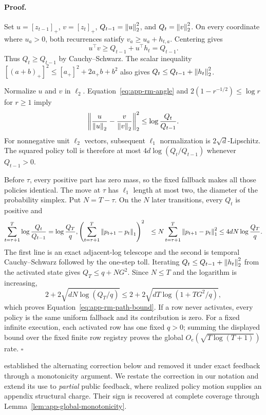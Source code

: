 \paragraph{Proof.}
Set $u=[z_{t-1}]_+$, $v=[z_t]_+$,
$Q_{t-1}=\left\lVert u \right\rVert_2^2$, and $Q_t=\left\lVert v \right\rVert_2^2$.  On every coordinate where
$u_a>0$, both recurrences satisfy $v_a\ge u_a+h_{t,a}$.  Centering gives
\begin{equation}
u^\top v\ge Q_{t-1}+u^\top h_t=Q_{t-1}.
\label{eq:app-rm-angle}
\end{equation}
Thus $Q_t\ge Q_{t-1}$ by Cauchy--Schwarz.  The scalar inequality
$[(a+b)_+]^2\le[a_+]^2+2a_+b+b^2$ also gives
$Q_t\le Q_{t-1}+\left\lVert h_t \right\rVert_2^2$.

Normalize $u$ and $v$ in $\ell_2$.  Equation~\ref{eq:app-rm-angle} and
$2(1-r^{-1/2})\le\log r$ for $r\ge1$ imply
\begin{equation}
\left\lVert \frac{u}{\left\lVert u \right\rVert_2}-\frac{v}{\left\lVert v \right\rVert_2} \right\rVert_2^2
\le\log\frac{Q_t}{Q_{t-1}}.
\end{equation}
For nonnegative unit $\ell_2$ vectors, subsequent $\ell_1$ normalization is
$2\sqrt d$-Lipschitz.  The squared policy toll is therefore at most
$4d\log(Q_t/Q_{t-1})$ whenever $Q_{t-1}>0$.

Before $\tau$, every positive part has zero mass, so the fixed fallback makes
all those policies identical.  The move at $\tau$ has $\ell_1$ length at
most two, the diameter of the probability simplex.  Put $N=T-\tau$.  On the
$N$ later transitions, every $Q_t$ is positive and
\begin{align}
\sum_{t=\tau+1}^{T}\log\frac{Q_t}{Q_{t-1}}
&=\log\frac{Q_T}{q},\nonumber
\left(\sum_{t=\tau+1}^{T}\left\lVert p_{t+1}-p_t \right\rVert_1\right)^2
&\le N\sum_{t=\tau+1}^{T}\left\lVert p_{t+1}-p_t \right\rVert_1^2
\le4dN\log\frac{Q_T}{q}.
\label{eq:app-rm-temporal-telescope}
\end{align}
The first line is an exact adjacent-log telescope and the second is temporal
Cauchy--Schwarz followed by the one-step toll.  Iterating
$Q_t\le Q_{t-1}+\left\lVert h_t \right\rVert_2^2$ from the activated state gives
$Q_T\le q+NG^2$.  Since $N\le T$ and the logarithm is increasing,
\[
2+2\sqrt{dN\log(Q_T/q)}
\le2+2\sqrt{dT\log(1+TG^2/q)},
\]
which proves Equation~\ref{eq:app-rm-path-bound}.  If a row never activates,
every policy is the same uniform fallback and its contribution is zero.  For
a fixed infinite execution, each activated row has one fixed $q>0$; summing
the displayed bound over the fixed finite row registry proves the global
$O_e(\sqrt{T\log(T+1)})$ rate. \hfill$\square$

\citet{burch2019revisiting} established the alternating correction below and
removed it under exact feedback through a monotonicity argument.  We restate
the correction in our notation and extend its use to \emph{partial} public
feedback, where realized policy motion supplies an appendix structural charge.
Their sign is recovered at
complete coverage through Lemma~\ref{lem:app-global-monotonicity}.

